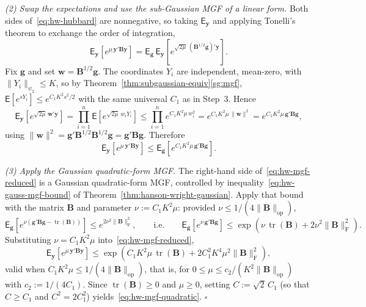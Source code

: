 \documentclass[12pt,a4paper]{article}
\makeatletter
\theoremstyle{definition}
\renewenvironment{proof}[1][\proofname]{\par
  \pushQED{\qed}%
  \normalfont \topsep6\p@\@plus6\p@\relax
  \trivlist
  \item[\hskip\labelsep\bfseries #1\@addpunct{.}]\ignorespaces
}{%
  \popQED\endtrivlist\@endpefalse
}
\newcommand\expc{\mathsf{E}}
\DeclareMathOperator\tr{tr}
\newcommand{\by}{\mathbf{y}}
\newcommand{\bw}{\mathbf{w}}
\newcommand{\bB}{\mathbf{B}}
\newcommand{\bg}{\mathbf{g}}
\newcommand{\opnorm}[1]{\|#1\|_{\mathrm{op}}}
\newcommand{\fnorm}[1]{\|#1\|_{\mathrm{F}}}
\makeatother
\begin{document}
\begin{proof}
\emph{(2) Swap the expectations and use the sub-Gaussian MGF of a linear form.} Both sides of~\eqref{eq:hw-hubbard} are nonnegative, so taking $\expc_\by$ and applying Tonelli's theorem to exchange the order of integration,
\[
\expc_\by\!\left[e^{\mu\,\by'\bB\by}\right] = \expc_\bg\,\expc_\by\!\left[e^{\sqrt{2\mu}\,(\bB^{1/2}\bg)'\by}\right].
\]
Fix $\bg$ and set $\bw = \bB^{1/2}\bg$. The coordinates $Y_i$ are independent, mean-zero, with $\|Y_i\|_{\psi_2} \leqslant K$, so by Theorem~\ref{thm:subgaussian-equiv}\ref{sg:mgf}, $\expc[e^{s Y_i}] \leqslant e^{C_1 K^2 s^2/2}$ with the same universal $C_1$ as in Step~3. Hence
\[
\expc_\by\!\left[e^{\sqrt{2\mu}\,\bw'\by}\right] = \prod_{i=1}^n \expc\!\left[e^{\sqrt{2\mu}\,w_i Y_i}\right] \leqslant \prod_{i=1}^n e^{C_1 K^2 \mu\, w_i^2} = e^{C_1 K^2 \mu\,\|\bw\|^2} = e^{C_1 K^2 \mu\,\bg'\bB\bg},
\]
using $\|\bw\|^2 = \bg'\bB^{1/2}\bB^{1/2}\bg = \bg'\bB\bg$. Therefore
\begin{equation}\label{eq:hw-mgf-reduced}
\expc_\by\!\left[e^{\mu\,\by'\bB\by}\right] \leqslant \expc_\bg\!\left[e^{C_1 K^2 \mu\,\bg'\bB\bg}\right].
\end{equation}

\emph{(3) Apply the Gaussian quadratic-form MGF.} The right-hand side of~\eqref{eq:hw-mgf-reduced} is a Gaussian quadratic-form MGF, controlled by inequality~\eqref{eq:hw-gauss-mgf-bound} of Theorem~\ref{thm:hanson-wright-gaussian}. Apply that bound with the matrix $\bB$ and parameter $\nu := C_1 K^2 \mu$: provided $\nu \leqslant 1/(4\opnorm{\bB})$,
\[
\expc_\bg\!\left[e^{\nu(\bg'\bB\bg - \tr(\bB))}\right] \leqslant e^{2\nu^2\fnorm{\bB}^2}, \qquad\text{i.e.}\qquad \expc_\bg\!\left[e^{\nu\,\bg'\bB\bg}\right] \leqslant \exp\!\left(\nu\,\tr(\bB) + 2\nu^2\fnorm{\bB}^2\right).
\]
Substituting $\nu = C_1 K^2\mu$ into~\eqref{eq:hw-mgf-reduced},
\[
\expc_\by\!\left[e^{\mu\,\by'\bB\by}\right] \leqslant \exp\!\left(C_1 K^2\mu\,\tr(\bB) + 2 C_1^2 K^4\mu^2\fnorm{\bB}^2\right),
\]
valid when $C_1 K^2\mu \leqslant 1/(4\opnorm{\bB})$, that is, for $0 \leqslant \mu \leqslant c_2/(K^2\opnorm{\bB})$ with $c_2 := 1/(4C_1)$. Since $\tr(\bB) \geqslant 0$ and $\mu \geqslant 0$, setting $C := \sqrt{2}\,C_1$ (so that $C \geqslant C_1$ and $C^2 = 2C_1^2$) yields~\eqref{eq:hw-mgf-quadratic}. \hfill$\square$


\end{proof}
\end{document}
